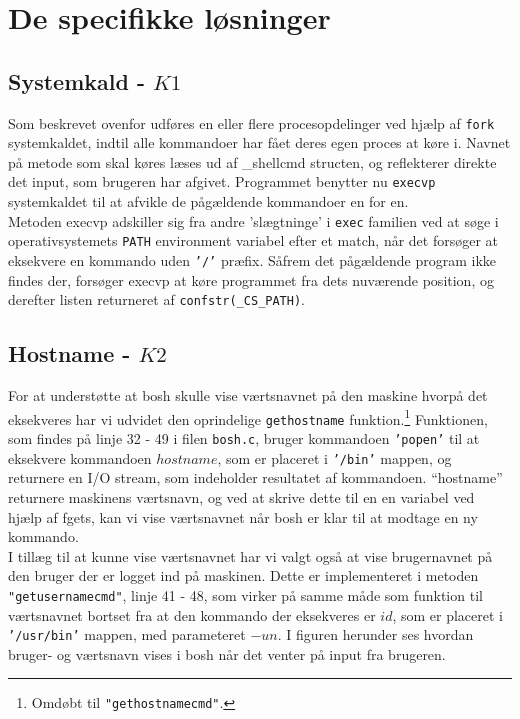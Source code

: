 \documentclass{article}
\begin{document}
\section{De specifikke løsninger}

\subsection{Systemkald - $K1$}
Som beskrevet ovenfor udføres en eller flere procesopdelinger ved hjælp af \texttt{fork} systemkaldet, indtil alle kommandoer har fået deres egen proces at køre i. Navnet på metode som skal køres læses ud af \_shellcmd structen, og reflekterer direkte det input, som brugeren har afgivet. Programmet benytter nu \texttt{execvp} systemkaldet til at afvikle de pågældende kommandoer en for en.\\

Metoden execvp adskiller sig fra andre 'slægtninge' i \texttt{exec} familien ved at søge i operativsystemets \texttt{PATH} environment variabel efter et match, når det forsøger at eksekvere en kommando uden \texttt{'/'} præfix. Såfrem det pågældende program ikke findes der, forsøger execvp at køre programmet fra dets nuværende position, og derefter listen returneret af \texttt{confstr(\_CS\_PATH)}.

\subsection{Hostname - $K2$}
For at understøtte at bosh skulle vise værtsnavnet på den maskine hvorpå det eksekveres har vi udvidet den oprindelige \texttt{gethostname} funktion.\footnote{Omdøbt til \texttt{"gethostnamecmd"}.}  Funktionen, som findes på linje 32 - 49 i filen \texttt{bosh.c}, bruger kommandoen \texttt{'popen'} til at eksekvere kommandoen $hostname$, som er placeret i \texttt{'/bin'} mappen, og returnere en I/O stream, som indeholder resultatet af kommandoen. “hostname” returnere maskinens værtsnavn, og ved at skrive dette til en en variabel ved hjælp af fgets, kan vi vise værtsnavnet når bosh er klar til at modtage en ny kommando.\\
I tillæg til at kunne vise værtsnavnet har vi valgt også at vise brugernavnet på den bruger der er logget ind på maskinen. Dette er implementeret i metoden \texttt{"getusernamecmd"}, linje 41 - 48, som virker på samme måde som funktion til værtsnavnet bortset fra at den kommando der eksekveres er $id$, som er placeret i \texttt{'/usr/bin'} mappen, med parameteret $-un$. I figuren herunder ses hvordan bruger- og værtsnavn vises i bosh når det venter på input fra brugeren. 
\end{document}
